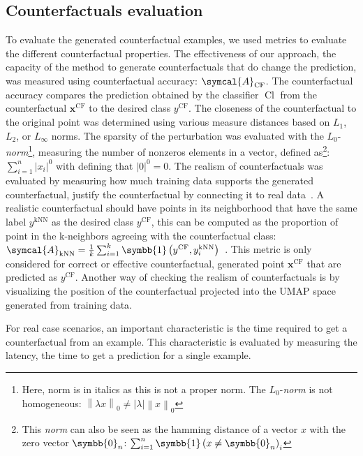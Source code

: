 \documentclass[../main.tex]{subfiles}
\begin{document}
	\subsection{Counterfactuals evaluation}
		To evaluate the generated counterfactual examples, we used metrics to evaluate the different counterfactual properties.
		The effectiveness of our approach, \ie{}the capacity of the method to generate counterfactuals that do change the prediction, was measured using counterfactual accuracy: \(\symcal{A}_{\text{CF}}\).
		The counterfactual accuracy compares the prediction obtained by the classifier \(\operatorname{Cl}\) from the counterfactual \(\symbf{x}^{\text{CF}}\) to the desired class \(y^{\text{CF}}\).
		The closeness of the counterfactual to the original point was determined using various measure distances based on \(L_{1}\), \(L_{2}\), or \(L_{\infty}\) norms.
		The sparsity of the perturbation was evaluated with the \(L_{0}\)-\emph{norm}\footnote{Here, norm is in italics as this is not a proper norm. The \(L_{0}\)-\emph{norm} is not homogeneous: \(\left\|\lambda x \right\|_{0} \neq \left|\lambda\right| \left\| x \right\|_{0}\)}, measuring the number of nonzeros elements in a vector, defined as\footnote{This \emph{norm} can also be seen as the hamming distance of a vector \(x\) with the zero vector \(\symbb{0}_{n}\): \(\sum_{i=1}^{n} \symbb{1}\left(x \neq \symbb{0}_{n}\right)_{i}\)}: \(\sum_{i=1}^{n} \left|x_{i}\right|^{0}\) with defining that \(\left|0\right|^{0}=0\).
		The realism of counterfactuals was evaluated by measuring how much training data supports the generated counterfactual, \ie{} justify the counterfactual by connecting it to real data~\cite{JustifyCF}.
		A realistic counterfactual should have points in its neighborhood that have the same label \( y^{\text{kNN}}\) as the desired class \(y^{\text{CF}}\), this can be computed as the proportion of point in the k-neighbors agreeing with the counterfactual class: \(\symcal{A}_{\text{kNN}} = \frac{1}{k}\sum_{i=1}^{k}\symbb{1}\left(y^{\text{CF}},  y^{\text{kNN}}_{i}\right)\)~\cite{Carla_CF}.
		This metric is only considered for correct or effective counterfactual, generated point \(\symbf{x}^{\text{CF}}\) that are predicted as \(y^{\text{CF}}\).
		Another way of checking the realism of counterfactuals is by visualizing the position of the counterfactual projected into the UMAP space generated from training data.

		For real case scenarios, an important characteristic is the time required to get a counterfactual from an example.
		This characteristic is evaluated by measuring the latency, the time to get a prediction for a single example.
\end{document}
